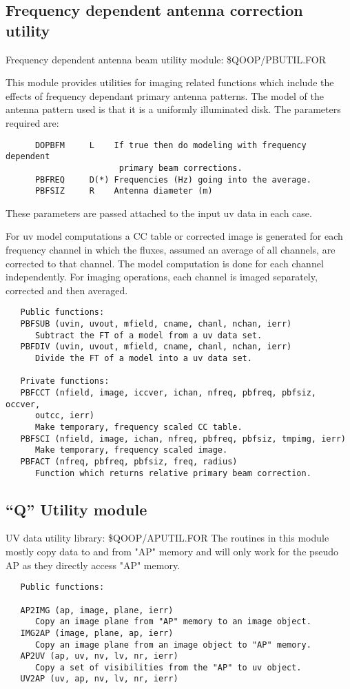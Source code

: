 \subsection{Frequency dependent antenna correction utility}
   Frequency dependent antenna beam utility module: \$QOOP/PBUTIL.FOR

   This module provides utilities for imaging related functions which
include the effects of frequency dependant primary antenna patterns.
The model of the antenna pattern used is that it is a uniformly
illuminated disk.   The parameters required are:
{\small\begin{verbatim}
      DOPBFM     L    If true then do modeling with frequency dependent
                       primary beam corrections.
      PBFREQ     D(*) Frequencies (Hz) going into the average.
      PBFSIZ     R    Antenna diameter (m)
\end{verbatim}}
These parameters are passed attached to the input uv data in each
case.

     For uv model computations a CC table or corrected image is
generated for each frequency channel in which the fluxes, assumed an
average of all channels, are corrected to that channel.  The model
computation is done for each channel independently.  For imaging
operations, each channel is imaged separately, corrected and then
averaged.

{\small\begin{verbatim}
   Public functions:
   PBFSUB (uvin, uvout, mfield, cname, chanl, nchan, ierr)
      Subtract the FT of a model from a uv data set.
   PBFDIV (uvin, uvout, mfield, cname, chanl, nchan, ierr)
      Divide the FT of a model into a uv data set.

   Private functions:
   PBFCCT (nfield, image, iccver, ichan, nfreq, pbfreq, pbfsiz, occver,
      outcc, ierr)
      Make temporary, frequency scaled CC table.
   PBFSCI (nfield, image, ichan, nfreq, pbfreq, pbfsiz, tmpimg, ierr)
      Make temporary, frequency scaled image.
   PBFACT (nfreq, pbfreq, pbfsiz, freq, radius)
      Function which returns relative primary beam correction.
\end{verbatim}}

\subsection{ ``Q'' Utility module}
   UV data utility library: \$QOOP/APUTIL.FOR
   The routines in this module mostly copy data to and from "AP" memory
and will only work for the pseudo AP as they directly access "AP"
memory.
{\small\begin{verbatim}
   Public functions:

   AP2IMG (ap, image, plane, ierr)
      Copy an image plane from "AP" memory to an image object.
   IMG2AP (image, plane, ap, ierr)
      Copy an image plane from an image object to "AP" memory.
   AP2UV (ap, uv, nv, lv, nr, ierr)
      Copy a set of visibilities from the "AP" to uv object.
   UV2AP (uv, ap, nv, lv, nr, ierr)

\end{verbatim}}

